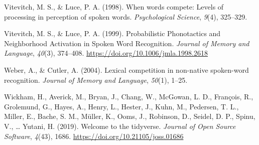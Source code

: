 \documentclass[
]{article}
\newlength{\cslhangindent}
\newenvironment{CSLReferences}[2] %
 {\begin{list}{}{%
  \setlength{\itemindent}{0pt}
  \setlength{\leftmargin}{0pt}
  \setlength{\parsep}{0pt}
  \ifodd #1
   \setlength{\leftmargin}{\cslhangindent}
   \setlength{\itemindent}{-1\cslhangindent}
  \fi
  \setlength{\itemsep}{#2\baselineskip}}}
 {\end{list}}
\begin{document}
\begin{CSLReferences}{1}{0}
Vitevitch, M. S., \& Luce, P. A. (1998). When words compete: Levels of
processing in perception of spoken words. \emph{Psychological Science},
\emph{9}(4), 325--329.

Vitevitch, M. S., \& Luce, P. A. (1999). Probabilistic {Phonotactics}
and {Neighborhood Activation} in {Spoken Word Recognition}.
\emph{Journal of Memory and Language}, \emph{40}(3), 374--408.
\url{https://doi.org/10.1006/jmla.1998.2618}

Weber, A., \& Cutler, A. (2004). Lexical competition in non-native
spoken-word recognition. \emph{Journal of Memory and Language},
\emph{50}(1), 1--25.

Wickham, H., Averick, M., Bryan, J., Chang, W., McGowan, L. D.,
François, R., Grolemund, G., Hayes, A., Henry, L., Hester, J., Kuhn, M.,
Pedersen, T. L., Miller, E., Bache, S. M., Müller, K., Ooms, J.,
Robinson, D., Seidel, D. P., Spinu, V., \ldots{} Yutani, H. (2019).
Welcome to the tidyverse. \emph{Journal of Open Source Software},
\emph{4}(43), 1686. \url{https://doi.org/10.21105/joss.01686}

\end{CSLReferences}
\end{document}
